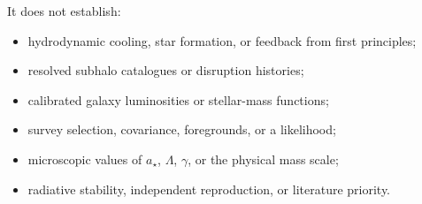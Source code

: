 It does not establish:
\begin{itemize}
\item hydrodynamic cooling, star formation, or feedback from first principles;
\item resolved subhalo catalogues or disruption histories;
\item calibrated galaxy luminosities or stellar-mass functions;
\item survey selection, covariance, foregrounds, or a likelihood;
\item microscopic values of $a_\star$, $\Lambda$, $\gamma$, or the physical mass scale;
\item radiative stability, independent reproduction, or literature priority.
\end{itemize}

